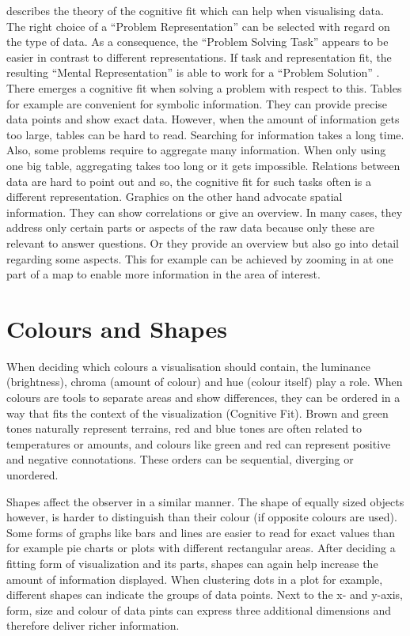 \cite{vessey1991} describes the theory of the cognitive fit which can help when visualising data. The right choice of a ``Problem Representation'' can be selected with regard on the type of data. As a consequence, the ``Problem Solving Task''  appears to be easier in contrast to different representations. If task and representation fit, the resulting ``Mental Representation'' is able to work for a ``Problem Solution'' \citep [p.221]{vessey1991}. There emerges a cognitive fit when solving a problem with respect to this. Tables for example are convenient for symbolic information. They can provide precise data points and show exact data. However, when the amount of information gets too large, tables can be hard to read. Searching for information takes a long time. Also, some problems require to aggregate many information. When only using one big table, aggregating takes too long or it gets impossible. Relations between data are hard to point out and so, the cognitive fit for such tasks often is a different representation. Graphics on the other hand advocate spatial information. They can show correlations or give an overview.  In many cases, they address only certain parts or aspects of the raw data because only these are relevant to answer questions. Or they provide an overview but also go into detail regarding some aspects. This for example can be achieved by zooming in at one part of a map to enable more information in the area of interest.

\section*{Colours and Shapes}

When deciding which colours a visualisation should contain, the luminance (brightness), chroma (amount of colour) and hue (colour itself) play a role. When colours are tools to separate areas and show differences, they can be ordered in a way that fits the context of the visualization (Cognitive Fit). Brown and green tones naturally represent terrains, red and blue tones are often related to temperatures or amounts, and colours like green and red can represent positive and negative connotations. These orders can be sequential, diverging or unordered.

Shapes affect the observer in a similar manner. The shape of equally sized objects however, is harder to distinguish than their colour (if opposite colours are used). Some forms of graphs like bars and lines are easier to read for exact values than for example pie charts or plots with different rectangular areas. After deciding a fitting form of visualization and its parts, shapes can again help increase the amount of information displayed. When clustering dots in a plot for example, different shapes can indicate the  groups of data points. Next to the x- and y-axis, form, size and colour of data pints can express three additional dimensions and therefore deliver richer information.

